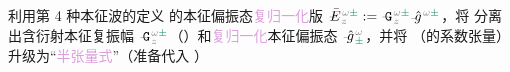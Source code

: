 利用第 4 种\textcolor{PineGreen}{本征波}的定义  的\textcolor{PineGreen}{本征偏振态}\textcolor{Plum}{复归一化}版 $\Xint{\mathcolor{gray}{-}}{25}{\bar{E}}^{\;\! \mathcolor{gray}{\omega} \textcolor{PineGreen}{\pm}}_{\;\! \mathcolor{gray}{z}} := \Xint{\mathcolor{gray}{-}}{16}{\mathtt{G}}^{\;\! \mathcolor{gray}{\omega} \textcolor{PineGreen}{\pm}}_{\;\! \mathcolor{gray}{z}} \Xint{{}^{}_{\mathcolor{gray}{-}}}{10}{\hat{g}}^{\;\! \mathcolor{gray}{\omega} \textcolor{PineGreen}{\pm} }$，将  分离出\textcolor{PineGreen}{含衍射本征复振幅} $\Xint{\mathcolor{gray}{-}}{16}{\mathtt{G}}^{\;\!\mathcolor{gray}{\omega} \textcolor{PineGreen}{\pm}}_{\;\! \mathcolor{gray}{z}}$（）和\textcolor{Plum}{复归一化}\textcolor{PineGreen}{本征偏振态} $\Xint{{}^{}_{\mathcolor{gray}{-}}}{10}{\hat{g}}^{\;\!\mathcolor{gray}{\omega}}_{\;\! \textcolor{PineGreen}{\pm}}$，并将 （的系数张量）升级为“\textcolor{Plum}{半张量式}”（准备代入 ）
